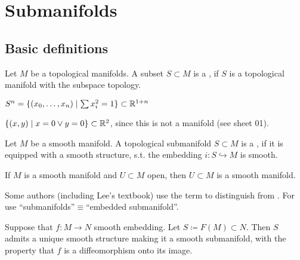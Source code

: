 \chapter{Submanifolds}
\section{Basic definitions}

\begin{definition*}
    Let \(M\) be a topological manifolds. A subset \(S\subset M\) is a ,
    if \(S\) is a topological manifold with the subspace topology.
\end{definition*}

\begin{example}
    \(S^n=\{(x_0,\dots,x_n)\mid \sum x_i^2=1\}\subset\mathbb{R}^{1+n}\)
\end{example}
\begin{example}
    \(\{(x,y)\mid x=0\lor y=0\}\subset\mathbb{R}^2\), since this is not a manifold (see sheet 01).
\end{example}
\begin{definition*}
    Let \(M\) be a smooth manifold. A topological submanifold \(S\subset M\) is a , if 
    it is equipped with a smooth structure, s.t. the embedding \(i:S\hookrightarrow M\) is smooth.   
\end{definition*}

\begin{example}
    If \(M\) is a smooth manifold and \(U\subset M\) open, then \(U\subset M\) is a smooth manifold.
\end{example}


\begin{remark}
    Some authors (including Lee's textbook) use the term  to distinguish 
    from . For use ``submanifolds''\(\equiv\)``embedded submanifold''.
\end{remark}  

\begin{lemma}\label{lem:5.1}
    Suppose that \(f:M\to N\) smooth embedding. Let \(S\coloneqq F(M)\subset N\). Then 
    \(S\) admits a unique smooth structure making it a smooth submanifold, with the property that 
    \(f\) is a diffeomorphism onto its image.
\end{lemma}

